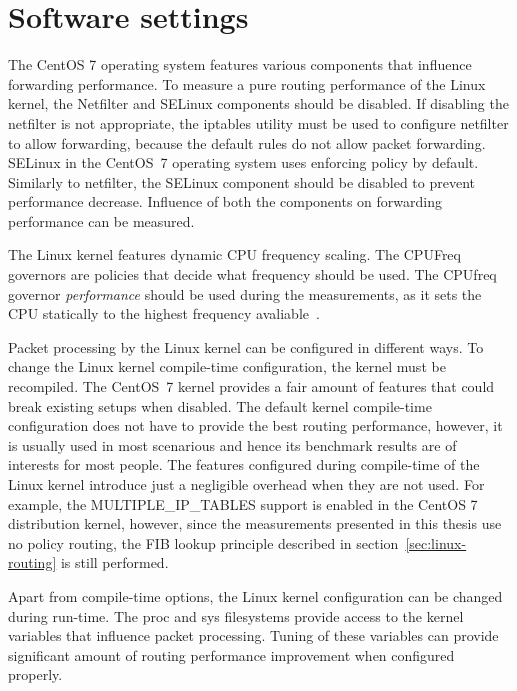
\section{Software settings}\label{sec:analysis-settings}
The CentOS 7 operating system features various components that influence forwarding performance.
To measure a pure routing performance of the Linux kernel,
the Netfilter and SELinux components should be disabled.
If disabling the netfilter is not appropriate, the iptables utility must be used to configure netfilter to allow forwarding,
because the default rules do not allow packet forwarding.
SELinux in the CentOS~7 operating system uses enforcing policy by default.
Similarly to netfilter, the SELinux component should be disabled to prevent performance decrease.
Influence of both the components on forwarding performance can be measured.

The Linux kernel features dynamic CPU frequency scaling.
The CPUFreq governors are policies that decide what frequency should be used.
The CPUfreq governor {\it{performance}} should be used during the measurements, as it sets the CPU statically to the
highest frequency avaliable~\cite{cpufreq-governors}. %

Packet processing by the Linux kernel can be configured in different ways.
To change the Linux kernel compile-time configuration, the kernel must be recompiled.
The CentOS~7 kernel provides a fair amount of features that could break existing setups when disabled.
The default kernel compile-time configuration does not have to provide the best routing performance,
however, it is usually used in most scenarious and hence its benchmark results are of interests for most people.
The features configured during compile-time of the Linux kernel introduce
just a negligible overhead when they are not used.
For example, the MULTIPLE\_IP\_TABLES support is enabled in the CentOS 7 distribution kernel, however,
since the measurements presented in this thesis use no policy routing,
the FIB lookup principle described in section~\ref{sec:linux-routing} is still performed.

Apart from compile-time options, the Linux kernel configuration can be changed during run-time.
The proc and sys filesystems provide access to the kernel variables that influence packet processing.
Tuning of these variables can provide significant amount of routing performance improvement when configured properly.

